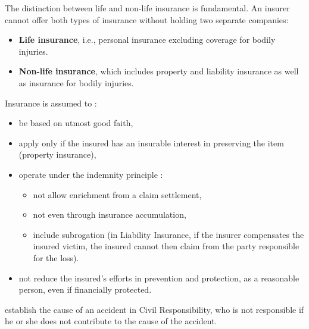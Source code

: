 \begin{f}
	
The distinction between life and non-life insurance is fundamental. An insurer cannot offer both types of insurance without holding two separate companies: 
\begin{itemize}
	\item \textbf{Life insurance}, i.e., personal insurance excluding coverage for bodily injuries.
	\item \textbf{Non-life insurance}, which includes property and liability insurance as well as insurance for bodily injuries.
\end{itemize}
\end{f}


\begin{f}
	
	
Insurance is assumed to :
	\begin{itemize}
		\item be based on utmost good faith,
		\item apply only if the insured has an insurable interest in preserving the item (property insurance),
		\item operate under the indemnity principle :
		\begin{itemize}
			\item not allow enrichment from a claim settlement,
			\item not even through insurance accumulation,
			\item include subrogation (in Liability Insurance, if the insurer compensates the insured victim, the insured cannot then claim from the party responsible for the loss).
		\end{itemize}
		\item not reduce the insured’s efforts in prevention and protection, as a reasonable person, even if financially protected.
	\end{itemize}
	\item establish the cause of an accident in Civil Responsibility, who is not responsible if he or she does not contribute to the cause of the accident.
\end{f}


